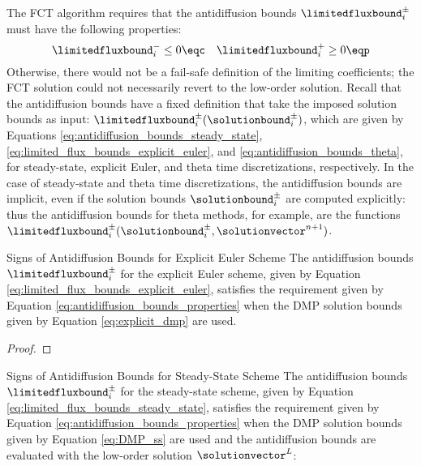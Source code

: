 The FCT algorithm requires that the antidiffusion bounds
$\limitedfluxbound_i^\pm$ must have the following properties:
\begin{equation}\label{eq:antidiffusion_bounds_properties}
  \limitedfluxbound_i^-\leq 0 \eqc \quad \limitedfluxbound_i^+\geq 0 \eqp
\end{equation}
Otherwise, there would not be a fail-safe definition of the limiting
coefficients; the FCT solution could not necessarily revert to the low-order
solution.
Recall that the antidiffusion bounds have a fixed definition that take the
imposed solution bounds as input:
$\limitedfluxbound_i^\pm(\solutionbound_i^\pm)$, which are given
by Equations
\eqref{eq:antidiffusion_bounds_steady_state},
\eqref{eq:limited_flux_bounds_explicit_euler}, and
\eqref{eq:antidiffusion_bounds_theta},
for steady-state, explicit Euler, and theta time discretizations, respectively.
In the case of steady-state and theta time discretizations, the
antidiffusion bounds are implicit, even if the solution bounds
$\solutionbound_i^\pm$ are computed explicitly: thus the antidiffusion
bounds for theta methods, for example, are the functions
$\limitedfluxbound_i^\pm(\solutionbound_i^\pm,\solutionvector^{n+1})$.

\begin{theorem}{Signs of Antidiffusion Bounds for Explicit Euler Scheme}
The antidiffusion bounds $\limitedfluxbound_i^\pm$ for the explicit Euler
scheme, given by Equation \eqref{eq:limited_flux_bounds_explicit_euler},
satisfies the requirement given by Equation
\eqref{eq:antidiffusion_bounds_properties} when the DMP solution bounds given
by Equation \eqref{eq:explicit_dmp} are used.
\end{theorem}

\begin{proof}
\end{proof}
\begin{theorem}{Signs of Antidiffusion Bounds for Steady-State Scheme}
The antidiffusion bounds $\limitedfluxbound_i^\pm$ for the steady-state
scheme, given by Equation \eqref{eq:limited_flux_bounds_steady_state},
satisfies the requirement given by Equation
\eqref{eq:antidiffusion_bounds_properties} when the DMP solution bounds given
by Equation \eqref{eq:DMP_ss} are used and the antidiffusion bounds are
evaluated with the low-order solution $\solutionvector^L$:
\end{theorem}

